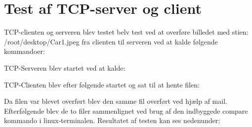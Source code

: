\chapter{Test af TCP-server og client}\label{ch:test}
TCP-clienten og serveren blev testet belv test ved at overføre billedet med stien: /root/desktop/Car1.jpeg fra clienten til serveren ved at kalde følgende kommandoer:

TCP-Serveren blev startet ved at kalde:

TCP-Clienten blev efter følgende startet og sat til at hente filen:

Da filen var blevet overført blev den samme fil overført ved hjælp af mail. Efterfølgende blev de to filer sammenlignet ved brug af den indbyggede compare kommando i linux-terminalen.
Resultatet af testen kan ses nedenunder:

